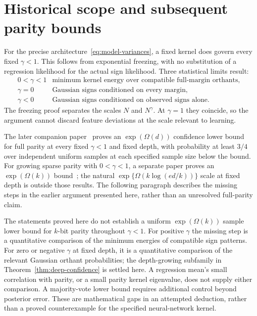 \documentclass[11pt]{article}
\theoremstyle{remark}
\begin{document}
\section{Historical scope and subsequent parity bounds}

For the precise architecture~\eqref{eq:model-variances}, a fixed kernel
does govern every fixed $\gamma<1$. This follows from exponential
freezing, with no substitution of a regression likelihood for the
actual sign likelihood. Three statistical limits result:
\[
\begin{array}{c|l}
 0<\gamma<1 & \text{minimum kernel energy over compatible full-margin orthants},\\
 \gamma=0 & \text{Gaussian signs conditioned on every margin},\\
 \gamma<0 & \text{Gaussian signs conditioned on observed signs alone}.
\end{array}
\]
The freezing proof separates the scales $N$ and $N^\gamma$. At
$\gamma=1$ they coincide, so the argument cannot discard feature
deviations at the scale relevant to learning.

The later companion paper~\cite{subcritical-exponential} proves an
$\exp(\Omega(d))$ confidence lower bound for full parity at every fixed
$\gamma<1$ and fixed depth, with probability at least $3/4$ over independent
uniform samples at each specified sample size below the bound.
For growing sparse parity with $0<\gamma<1$, a separate paper proves
an $\exp(\Omega(k))$ bound~\cite{growing-sparse-positive}; the natural
$\exp\{\Omega(k\log(ed/k))\}$ scale at fixed depth is outside those
results. The following paragraph describes the missing steps in the
earlier argument presented here, rather than an unresolved full-parity
claim.

The statements proved here do not establish a uniform
$\exp(\Omega(k))$ sample lower bound for $k$-bit parity throughout
$\gamma<1$. For positive $\gamma$ the missing step is a quantitative
comparison of the minimum energies of compatible sign patterns.
For zero or negative $\gamma$ at fixed depth, it is a quantitative
comparison of the relevant Gaussian orthant probabilities; the
depth-growing subfamily in Theorem~\ref{thm:deep-confidence} is
settled here. A regression mean's small
correlation with parity, or a small parity kernel eigenvalue, does
not supply either comparison. A majority-vote lower bound requires
additional control beyond posterior error. These are mathematical
gaps in an attempted deduction, rather than a proved counterexample
for the specified neural-network kernel.
\end{document}
